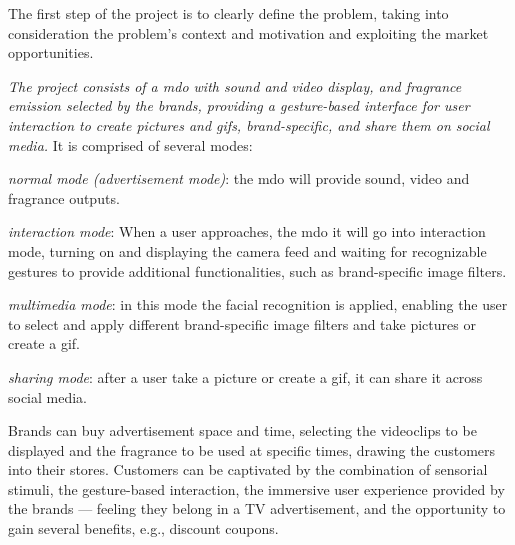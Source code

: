The first step of the project is to clearly define the problem, taking into
consideration the problem's context and motivation and exploiting the market
opportunities.

\emph{The project consists of a \gls{mdo} with sound and
video display, and fragrance emission selected by the brands, providing a gesture-based interface for
user interaction to create pictures and \gls{gif}s, brand-specific, and share them on
social media.} It is comprised of several modes:
\begin{item-c}
\item \emph{normal mode (advertisement mode)}: the \gls{mdo} will provide
  sound, video and fragrance outputs.
\item \emph{interaction mode}: When a user approaches, the \gls{mdo} it will
go into interaction mode, turning on and displaying the camera feed and waiting
for recognizable gestures to provide additional functionalities, such as
brand-specific image filters.
\item \emph{multimedia mode}: in this mode the facial recognition is applied,
  enabling the user to select and apply different brand-specific image filters and take pictures or create a \gls{gif}.
\item \emph{sharing mode}: after a user take a picture or create a \gls{gif}, it
  can share it across social media.
\end{item-c}

Brands can buy advertisement space and time, selecting the videoclips to be
displayed and the fragrance to be used at specific times, drawing the customers
into their stores. Customers can be captivated by the combination of sensorial
stimuli, the gesture-based interaction, the immersive user experience provided
by the brands --- feeling they belong in a TV advertisement, and the opportunity
to gain several benefits, e.g., discount coupons.
